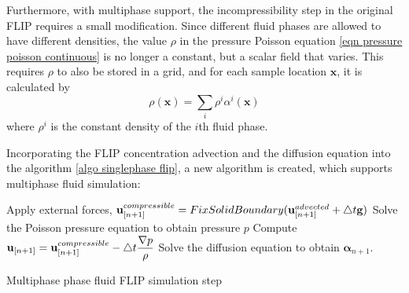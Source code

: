 Furthermore, with multiphase support, the incompressibility step in the original FLIP requires a small modification. Since different fluid phases are allowed to have different densities, the value $\rho$ in the pressure Poisson equation \ref{eqn pressure poisson continuous} is no longer a constant, but a scalar field that varies. This requires $\rho$ to also be stored in a grid, and for each sample location $\textbf{x}$, it is calculated by 
$$
\rho(\textbf{x}) = \sum_{i} \rho^i \alpha^i(\textbf{x})
$$
where $\rho^i$ is the constant density of the $i$th fluid phase.

Incorporating the FLIP concentration advection and the diffusion equation into the algorithm \ref{algo singlephase flip}, a new algorithm is created, which supports multiphase fluid simulation:

\gapM

\begin{algorithm}[H]
    \label{algo multiphase flip}

    \SetAlgoLined
    Apply external forces, $\textbf{u}_{[n+1]}^{compressible} =  FixSolidBoundary(\textbf{u}_{[n+1]}^{advected} + \triangle t \textbf{g})$\;
    Solve the Poisson pressure equation to obtain pressure $p$\;
    Compute $\textbf{u}_{[n+1]} = \textbf{u}_{[n+1]}^{compressible} - \triangle t \dfrac{\nabla p}{\rho}$\;
    Solve the diffusion equation to obtain $\bm{\alpha}_{n+1}$.

    \caption{Multiphase phase fluid FLIP simulation step}
\end{algorithm}

